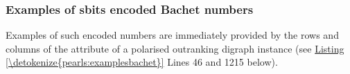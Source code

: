 \documentclass[a4paper,12pt,english]{sphinxhowto}
\begin{document}
\subsubsection{Examples of sbits encoded Bachet numbers}
\label{\detokenize{pearls:examples-of-sbits-encoded-bachet-numbers}}
\sphinxAtStartPar
Examples of such  encoded  numbers are immediately provided by the rows and columns of the  attribute of a polarised outranking digraph instance (see \hyperref[\detokenize{pearls:examplesbachet}]{Listing \ref{\detokenize{pearls:examplesbachet}}} Lines 4\sphinxhyphen{}6  and 12\sphinxhyphen{}15 below).
\def\sphinxLiteralBlockLabel{\label{\detokenize{pearls:examplesbachet}}}
%
\end{document}
